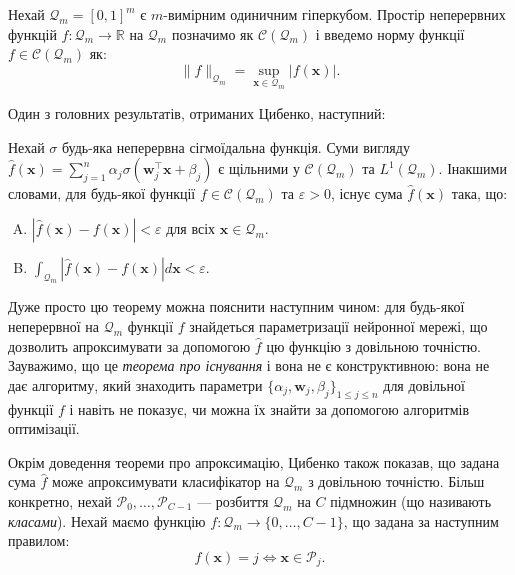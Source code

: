 Нехай $\mathcal{Q}_m = [0,1]^m$ є $m$-вимірним одиничним гіперкубом. Простір
неперервних функцій $f: \mathcal{Q}_m \to \mathbb{R}$ на $\mathcal{Q}_m$
позначимо як $\mathcal{C}(\mathcal{Q}_m)$ і введемо норму функції $f \in
\mathcal{C}(\mathcal{Q}_m)$ як:
\begin{equation*}
    \|f\|_{\mathcal{Q}_m} = \sup_{\mathbf{x} \in \mathcal{Q}_m} |f(\mathbf{x})|.
\end{equation*}

Один з головних результатів, отриманих Цибенко, наступний:
\begin{theorem}\label{theorem:cybenko_1}
    Нехай $\sigma$ будь-яка неперервна сігмоїдальна функція. Суми вигляду
    $\hat{f}(\mathbf{x}) = \sum_{j=1}^n
    \alpha_j\sigma(\boldsymbol{w}_j^{\top}\mathbf{x} + \beta_j)$ є щільними у
    $\mathcal{C}(\mathcal{Q}_m)$ та $L^1(\mathcal{Q}_m)$. Інакшими словами, для
    будь-якої функції $f \in \mathcal{C}(\mathcal{Q}_m)$ та $\varepsilon > 0$,
    існує сума $\hat{f}(\mathbf{x})$ така, що:
    \begin{enumerate}[(A)]
        \item $|\hat{f}(\mathbf{x})-f(\mathbf{x})|<\varepsilon$ для всіх $\mathbf{x} \in
        \mathcal{Q}_m$.
        \item $\int_{\mathcal{Q}_m}|\hat{f}(\mathbf{x})-f(\mathbf{x})|d\mathbf{x} <
        \varepsilon$.
    \end{enumerate}
\end{theorem}

Дуже просто цю теорему можна пояснити наступним чином: для будь-якої неперервної
на $\mathcal{Q}_m$ функції $f$ знайдеться параметризації нейронної мережі, що
дозволить апроксимувати за допомогою $\hat{f}$ цю функцію з довільною точністю.
Зауважимо, що це \textit{теорема про існування} і вона не є конструктивною: вона
не дає алгоритму, який знаходить параметри
$\{\alpha_j,\boldsymbol{w}_j,\beta_j\}_{1 \leq j \leq n}$ для довільної функції
$f$ і навіть не показує, чи можна їх знайти за допомогою алгоритмів оптимізації.

Окрім доведення теореми про апроксимацію, Цибенко також показав, що задана сума
$\hat{f}$ може апроксимувати класифікатор на $\mathcal{Q}_m$ з довільною
точністю. Більш конкретно, нехай $\mathcal{P}_0,\dots,\mathcal{P}_{C-1}$ ---
розбиття $\mathcal{Q}_m$ на $C$ підмножин (що називають \textit{класами}). Нехай
маємо функцію $f: \mathcal{Q}_m \to \{0,\dots,C-1\}$, що задана за наступним
правилом:
\begin{equation*}
    f(\mathbf{x}) = j \iff \mathbf{x} \in \mathcal{P}_j.
\end{equation*}

